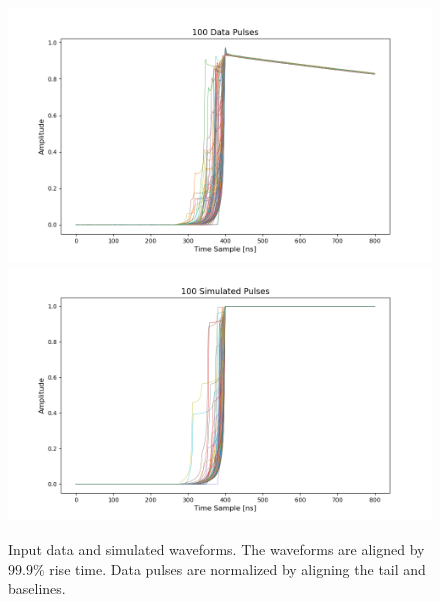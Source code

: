 \begin{figure}%
    \centering
    \includegraphics[width=0.9\linewidth,trim={4pc 0cm 6pc 1cm},clip]{ch7/figs/all_data_pulses.png}
    \includegraphics[width=0.9\linewidth,trim={4pc 0cm 6pc 1cm},clip]{ch7/figs/all_simulated_pulses.png}
    \caption{Input data and simulated waveforms. The waveforms are aligned by $99.9\%$ rise time. Data pulses are normalized by aligning the tail and baselines.}
   \label{ch7:figs:in_out}
\end{figure}

